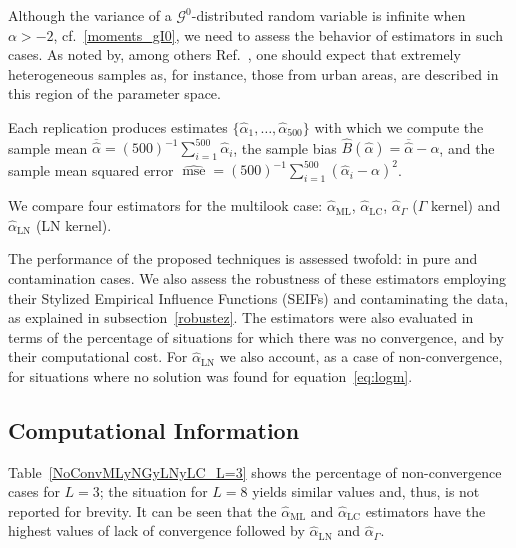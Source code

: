 \documentclass[twocolumn]{svjour3}
\begin{document}
	Although the variance of a $\mathcal{G}^0$-distributed random variable is infinite when $\alpha>-2$, cf.~\eqref{moments_gI0}, we need to assess the behavior of estimators in such cases.
	As noted by, among others Ref.~\cite[Fig.~5]{LowCostRobustEstimationfortheSingleLookGI0ModelUsingtheParetoDistributioninpress}, one should expect that extremely heterogeneous samples as, for instance, those from urban areas, are described in this region of the parameter space.
	
	Each replication produces estimates $\{\widehat{\alpha}_1, \dots, \widehat{\alpha}_{500}\}$ with which we compute 
	the sample mean $\overline{\widehat{\alpha}}=(500)^{-1}{\sum_{i=1}^{500}{\widehat{\alpha}_i}}$, 
	the sample bias $\widehat{B}(\widehat\alpha) = \overline{\widehat\alpha}- \alpha$, 
	and 
	the sample mean squared error $\widehat{\operatorname{mse}}=({500})^{-1}{\sum_{i=1}^{500}{(\widehat{\alpha}_i-\alpha)^2}}$.
	
	
	We compare four estimators for the multilook case: 
	$\widehat{\alpha}_{\text{{ML}}}$, 
	$\widehat{\alpha}_{\text{{LC}}}$, 
	$\widehat{\alpha}_{\Gamma}$ ($\Gamma$ kernel) and $\widehat{\alpha}_{\text{{LN}}}$ (LN kernel).
	
	The performance of the proposed techniques is assessed twofold: in pure and contamination cases. 
	We also assess the robustness of these estimators employing their Stylized Empirical Influence Functions (SEIFs) and contaminating the data, as explained in subsection~\ref{robustez}. 
	The estimators were also evaluated in terms of the percentage of situations for which there was no convergence, and by their computational cost. 
	For $\widehat{\alpha}_{\text{{LN}}}$ we also account, as a case of non-convergence, for situations where no solution was found for equation~\eqref{eq:logm}.
	
	
	\subsection{Computational Information}
	
	Table~\ref{NoConvMLyNGyLNyLC_L=3} shows the percentage of non-convergence cases for $L=3$; the situation for $L=8$ yields similar values and, thus, is not reported for brevity.
	It can be seen that the $\widehat{\alpha}_{\text{{ML}}}$ and $\widehat{\alpha}_{\text{{LC}}}$ estimators have the highest values of lack of convergence followed by  $\widehat{\alpha}_{\text{{LN}}}$ and $\widehat{\alpha}_{\Gamma}$.
	
\end{document}
